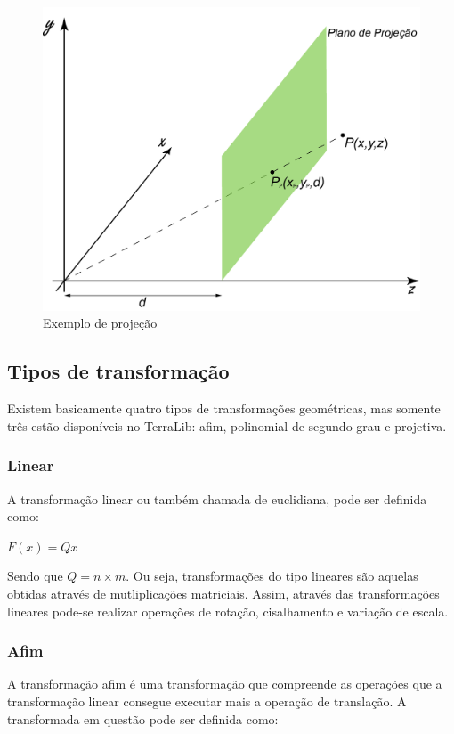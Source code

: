 \documentclass[9pt, a4paper, nofonttune, journal]{IEEEtran}
\begin{document}
\begin{figure}[H] 
\begin{center}
\includegraphics[scale=0.25]{figuras/projection1}
\caption{Exemplo de projeção}
\end{center}
\end{figure}

\subsection{Tipos de transformação}
Existem basicamente quatro tipos de transformações geométricas, mas somente três estão disponíveis no TerraLib:
afim, polinomial de segundo grau e projetiva.
\subsubsection{Linear}
A transformação linear ou também chamada de euclidiana, pode ser definida como:
\begin{center}
$F(x)=Qx$\end{center}
Sendo que $Q=n\times m$.
Ou seja, transformações do tipo lineares são aquelas obtidas através de mutliplicações matriciais.
Assim, através das transformações lineares pode-se realizar operações de rotação, cisalhamento e variação de escala.\cite{CGPPBook1}
\subsubsection{Afim}
A transformação afim é uma transformação que compreende as operações que a transformação linear
consegue executar mais a operação de translação. A transformada em questão pode ser definida como:
\end{document}
